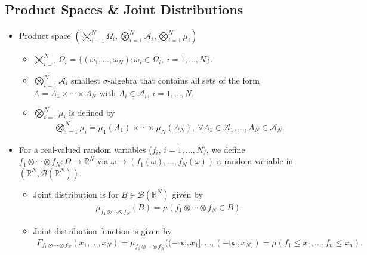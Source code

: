 \documentclass[oneside,11pt]{book}
\numberwithin{equation}{section}
\begin{document}
\subsection{Product Spaces \& Joint Distributions}
\begin{itemize}
    \item Product space $(\bigtimes_{i=1}^N \Omega_i,\bigotimes_{i=1}^N \mathcal{A}_i,\bigotimes_{i=1}^N \mu_i)$
    \begin{itemize}
        \item $\bigtimes_{i=1}^N \Omega_i = \{(\omega_1,\ldots,\omega_N);\omega_i\in\Omega_i,\ i = 1,\ldots,N\}$.
        \item $\bigotimes_{i=1}^N \mathcal{A}_i$ smallest $\sigma$-algebra that contains all sets of the form $A = A_1\times\cdots\times A_N$ with $A_i\in\mathcal{A}_i$, $i = 1,\ldots,N$.
        \item $\bigotimes_{i=1}^N \mu_i$ is defined by
        \begin{align*}
            \bigotimes_{i=1}^N \mu_i = \mu_1(A_1)\times\cdots\times\mu_N(A_N),\ \forall A_1\in\mathcal{A}_1,\ldots,A_N\in\mathcal{A}_N.
        \end{align*}
    \end{itemize}
    \item For a real-valued random variables ($f_i$, $i = 1,\ldots,N$), we define $f_1\otimes\cdots\otimes f_N:\Omega\to\mathbb{R}^N$ via $\omega\mapsto(f_1(\omega),\ldots,f_N(\omega))$ a random variable in $(\mathbb{R}^N,\mathcal{B}(\mathbb{R}^N))$.
    \begin{itemize}
        \item Joint distribution is for $B\in\mathcal{B}(\mathbb{R}^N)$ given by
        \begin{align*}
            \mu_{f_1\otimes\cdots\otimes f_N}(B) = \mu(f_1\otimes\cdots\otimes f_N\in B).
        \end{align*}
        \item Joint distribution function is given by
        \begin{align*}
            F_{f_1\otimes\cdots\otimes f_N}(x_1,\ldots,x_N) = \mu_{f_1\otimes\cdots\otimes f_N} ((-\infty,x_1],\ldots,(-\infty,x_N]) = \mu(f_1\le x_1,\ldots,f_n\le x_n).
        \end{align*}
    \end{itemize}
\end{itemize}
\end{document}
